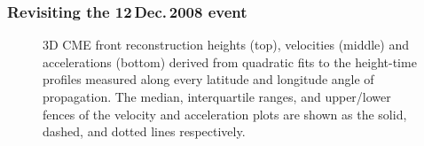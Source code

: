 \documentclass[preprint2]{aastex}
\begin{document}
\subsubsection{Revisiting the 12\,Dec.\,2008 event}

\begin{figure}[p]
\caption{3D CME front reconstruction heights (top), velocities (middle) and accelerations (bottom) derived from quadratic fits to the height-time profiles measured along every latitude and longitude angle of propagation. The median, interquartile ranges, and upper/lower fences of the velocity and acceleration plots are shown as the solid, dashed, and dotted lines respectively.}
\label{kins_inspect}
\end{figure}
\end{document}
